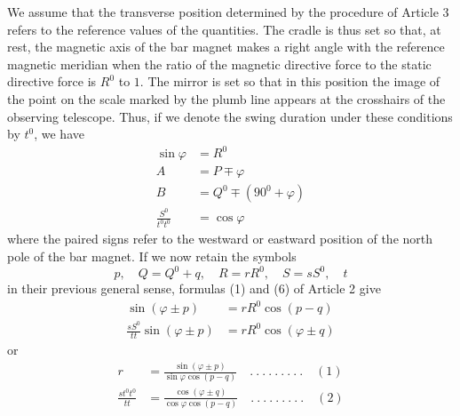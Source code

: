 We assume that the transverse position determined by the procedure of Article 3 refers to the reference values of the quantities. The cradle is thus set so that, at rest, the magnetic axis of the bar magnet makes a right angle with the reference magnetic meridian when the ratio of the magnetic directive force to the static directive force is $R^0$ to $1$. The mirror is set so that in this position the image of the point on the scale marked by the plumb line appears at the crosshairs of the observing telescope. Thus, if we denote the swing duration under these conditions by $t^0$, we have
\[
\begin{aligned}
\sin\varphi&=R^0\\
A&=P\mp\varphi\\
B&=Q^0\mp(90^0+\varphi)\\
\frac{S^0}{t^0t^0}&=\cos\varphi
\end{aligned}
\]
where the paired signs refer to the westward or eastward position of the north pole of the bar magnet. If we now retain the symbols
\[
p,\quad Q=Q^0+q,\quad R=rR^0,\quad S=sS^0,\quad t
\]
in their previous general sense, formulas (1) and (6) of Article 2 give
\[
\begin{aligned}
\sin(\varphi\pm p)&=rR^0\cos(p-q)\\
\frac{sS^0}{tt}\sin(\varphi\pm p)&=rR^0\cos(\varphi\pm q)
\end{aligned}
\]
or
\[
\begin{aligned}
r&=\frac{\sin(\varphi\pm p)}{\sin\varphi\cos(p-q)}\quad .\ .\ .\ .\ .\ .\ .\ .\ .\quad(1)\\
\frac{st^0t^0}{tt}&=\frac{\cos(\varphi\pm q)}{\cos\varphi\cos(p-q)}\quad .\ .\ .\ .\ .\ .\ .\ .\ .\quad(2)
\end{aligned}
\]

